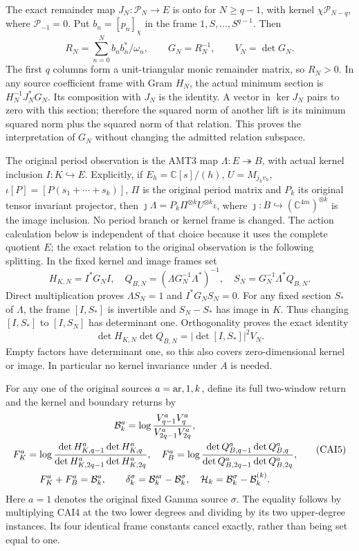 The exact remainder map $J_N:\mathcal P_N\to E$ is onto for
$N\ge q-1$, with kernel $\chi\mathcal P_{N-q}$, where
$\mathcal P_{-1}=0$. Put $b_n=[p_n]_\chi$ in the frame
$1,S,\ldots,S^{q-1}$. Then
\[
 R_N=\sum_{n=0}^N b_nb_n^*/\omega_n,\qquad
 G_N=R_N^{-1},\qquad V_N=\det G_N.\tag{CAI2}
\]
The first $q$ columns form a unit-triangular monic remainder matrix, so
$R_N>0$. In any source coefficient frame with Gram $H_N$, the actual
minimum section is $H_N^{-1}J_N^*G_N$. Its composition with $J_N$ is the
identity. A vector in $\ker J_N$ pairs to zero with this section;
therefore the squared norm of another lift is its minimum squared norm
plus the squared norm of that relation. This proves the interpretation
of $G_N$ without changing the admitted relation subspace.

The original period observation is the AMT3 map
$\Lambda:E\twoheadrightarrow B$, with actual kernel inclusion
$I:K\hookrightarrow E$. Explicitly, if $E_h=\mathbb C[s]/(h)$,
$U=M_{j_hv_h}$, $\iota[P]=[P(s_1+\cdots+s_k)]$, $\Pi$ is the original
period matrix and $P_k$ its original tensor invariant projector, then
$\jmath\Lambda=P_k\Pi^{\otimes k}U^{\otimes k}\iota$, where
$\jmath:B\hookrightarrow(\mathbb C^{4m})^{\otimes k}$ is the image
inclusion. No period branch or kernel frame is changed. The action
calculation below is independent of that choice because it uses the
complete quotient $E$; the exact relation to the original observation
is the following splitting. In the fixed kernel and image frames set
\[
 H_{K,N}=I^*G_NI,\quad
 Q_{B,N}=(\Lambda G_N^{-1}\Lambda^*)^{-1},\quad
 S_N=G_N^{-1}\Lambda^*Q_{B,N}.\tag{CAI3}
\]
Direct multiplication proves $\Lambda S_N=1$ and $I^*G_NS_N=0$.
For any fixed section $S_*$ of $\Lambda$, the frame $[I,S_*]$ is
invertible and $S_N-S_*$ has image in $K$. Thus changing $[I,S_*]$ to
$[I,S_N]$ has determinant one. Orthogonality proves the exact identity
\[
 \det H_{K,N}\det Q_{B,N}=|\det[I,S_*]|^2V_N.\tag{CAI4}
\]
Empty factors have determinant one, so this also covers zero-dimensional
kernel or image. In particular no kernel invariance under $A$ is needed.

For any one of the original sources $a={\rm ar},1,k$, define its full
two-window return and the kernel and boundary returns by
\[
\begin{gathered}
 \mathcal B_k^a=\log\frac{V_{q-1}^aV_q^a}{V_{2q-1}^aV_{2q}^a},\\
 F_K^a=\log\frac{\det H_{K,q-1}^a\det H_{K,q}^a}
                       {\det H_{K,2q-1}^a\det H_{K,2q}^a},\quad
 F_B^a=\log\frac{\det Q_{B,q-1}^a\det Q_{B,q}^a}
                       {\det Q_{B,2q-1}^a\det Q_{B,2q}^a},\\
 F_K^a+F_B^a=\mathcal B_k^a,\qquad
 \delta_k^\sigma=\mathcal B_k^{\rm ar}-\mathcal B_k^\sigma,\quad
 \mathcal H_k=\mathcal B_k^\sigma-\mathcal B_k^{(k)}.
\end{gathered}\tag{CAI5}
\]
Here $a=1$ denotes the original fixed Gamma source $\sigma$.
The equality follows by multiplying CAI4 at the two lower degrees and
dividing by its two upper-degree instances. Its four identical frame
constants cancel exactly, rather than being set equal to one.


